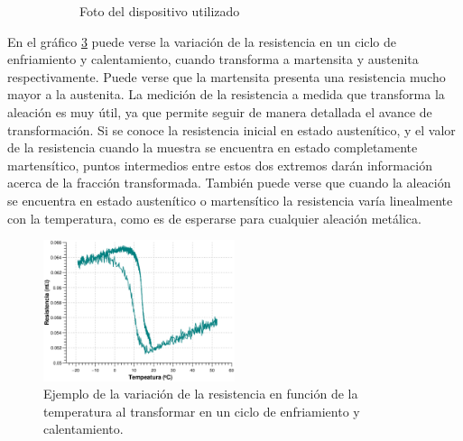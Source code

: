 \documentclass[a4paper,12pt,fleqn,twoside,openany]{book}
\begin{document}
\begin{figure}
\begin{subfigure}{0.4\textwidth}
        \caption{Foto del dispositivo utilizado}
        \label{fig:cuatropuntasyextensometro}
    \end{subfigure}
    \caption{}
\end{figure}


En el gráfico \ref{fig:RvsTClavo5} puede verse la variación de la resistencia en un ciclo de enfriamiento y calentamiento, cuando transforma a martensita y austenita respectivamente. Puede verse que la martensita presenta una resistencia mucho mayor a la austenita. La medición de la resistencia a medida que transforma la aleación es muy útil, ya que permite seguir 
de manera detallada el avance de transformación. Si se conoce la resistencia inicial en estado austenítico, y el valor de la resistencia cuando la 
muestra se encuentra en estado completamente martensítico, puntos intermedios entre estos dos extremos darán información acerca de la fracción transformada.
También puede verse que cuando la aleación se encuentra en estado austenítico o martensítico la resistencia varía linealmente con la temperatura, como es 
de esperarse para cualquier aleación metálica. 

\begin{figure}[h]
 \centering
 \includegraphics[width=0.5\textwidth]{Img/Resultados/RvsTClavo5.eps}
 \caption{Ejemplo de la variación de la resistencia en función de la temperatura al transformar en un ciclo de enfriamiento y calentamiento.} 
 \label{fig:RvsTClavo5}
 \end{figure}
% 
\end{document}

